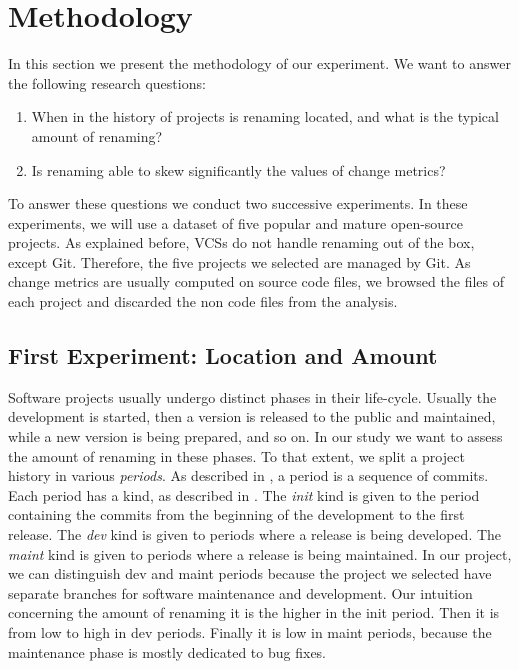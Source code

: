 \section{Methodology}
\label{sec:methodology}

In this section we present the methodology of our experiment. We want to answer the following research questions:

\begin{enumerate}
	\item When in the history of projects is renaming located, and what is the typical amount of renaming?
	\item Is renaming able to skew significantly the values of change metrics?
\end{enumerate}

To answer these questions we conduct two successive experiments. In these experiments, we will use a dataset of five popular and mature open-source projects. As explained before, VCSs do not handle renaming out of the box, except Git. Therefore, the five projects we selected are managed by Git. As change metrics are usually computed on source code files, we browsed the files of each project and discarded the non code files from the analysis.

\subsection{First Experiment: Location and Amount}

Software projects usually undergo distinct phases in their life-cycle. Usually the development is started, then a version is released to the public and maintained, while a new version is being prepared, and so on. In our study we want to assess the amount of renaming in these phases. To that extent, we split a project history in various \emph{periods}. As described in , a period is a sequence of commits. Each period has a kind, as described in . The \emph{init} kind is given to the period containing the commits from the beginning of the development to the first release. The \emph{dev} kind is given to periods where a release is being developed. The \emph{maint} kind is given to periods where a release is being maintained. In our project, we can distinguish dev and maint periods because the project we selected have separate branches for software maintenance and development. Our intuition concerning the amount of renaming it is the higher in the init period. Then it is from low to high in dev periods. Finally it is low in maint periods, because the maintenance phase is mostly dedicated to bug fixes.

